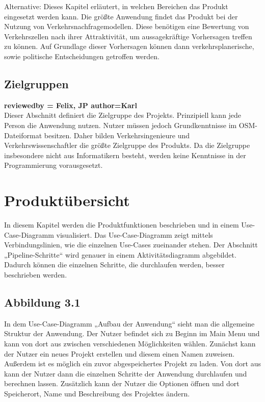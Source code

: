 \documentclass[parskip=full]{scrartcl} %
\begin{document}
Alternative:
Dieses Kapitel erläutert, in welchen Bereichen das Produkt eingesetzt werden kann. Die größte Anwendung findet das Produkt bei der Nutzung von Verkehrsnachfragemodellen. Diese benötigen eine Bewertung von Verkehrszellen nach ihrer Attraktivität, um aussagekräftige Vorhersagen treffen zu können. Auf Grundlage dieser Vorhersagen können dann verkehrsplanerische, sowie politische Entscheidungen getroffen werden.


\subsection{Zielgruppen}
\textbf{reviewedby = Felix, JP author=Karl\\}
Dieser Abschnitt definiert die Zielgruppe des Projekts. Prinzipiell kann jede Person die Anwendung nutzen. Nutzer müssen jedoch Grundkenntnisse im OSM-Dateiformat besitzen. Daher bilden Verkehrsingenieure und Verkehrswissenschaftler die größte Zielgruppe des Produkts. Da die Zielgruppe insbesondere nicht aus Informatikern besteht, werden keine Kenntnisse in der Programmierung vorausgesetzt.
\newpage







\section{Produktübersicht}
In diesem Kapitel werden die Produktfunktionen beschrieben und in einem Use-Case-Diagramm visualisiert. Das Use-Case-Diagramm zeigt mittels Verbindungslinien, wie die einzelnen Use-Cases zueinander stehen. Der Abschnitt „Pipeline-Schritte“ wird genauer in einem Aktivitätsdiagramm abgebildet. Dadurch können die einzelnen Schritte, die durchlaufen werden, besser beschrieben werden.

\subsection*{Abbildung 3.1}
In dem Use-Case-Diagramm „Aufbau der Anwendung“ sieht man die allgemeine Struktur der Anwendung. Der Nutzer befindet sich zu Beginn im Main Menu und kann von dort aus zwischen verschiedenen Möglichkeiten wählen.
Zunächst kann der Nutzer ein neues Projekt erstellen und diesem einen Namen zuweisen. Außerdem ist es möglich ein zuvor abgespeichertes Projekt zu laden. Von dort aus kann der Nutzer dann die einzelnen Schritte der Anwendung durchlaufen und berechnen lassen. 
Zusätzlich kann der Nutzer die Optionen öffnen und dort Speicherort, Name und Beschreibung des Projektes ändern.
\end{document}
